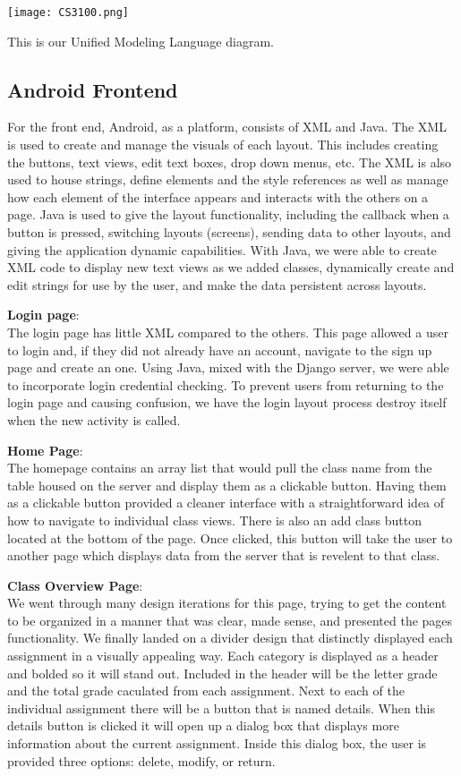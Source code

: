 \documentclass[a4paper]{article} %
\begin{document}
\centerline{\texttt{[image: CS3100.png]}}
This is our Unified Modeling Language diagram.

\subsection{Android Frontend}
For the front end, Android, as a platform, consists of XML and Java. The XML is used to create and manage the visuals of each layout. This includes creating the buttons, text views, edit text boxes, drop down menus, etc. The XML is also used to house strings, define elements and the style references as well as manage how each element of the interface appears and interacts with the others on a page. Java is used to give the layout functionality, including the callback when a button is pressed, switching layouts (screens), sending data to other layouts, and giving the application dynamic capabilities. With Java, we were able to create XML code to display new text views as we added classes, dynamically create and edit strings for use by the user, and make the data persistent across layouts.

\textbf{Login page}:\\
The login page has little XML compared to the others. This page allowed a user to login and, if they did not already have an account, navigate to the sign up page and create an one. Using Java, mixed with the Django server, we were able to incorporate login credential checking. To prevent users from returning to the login page and causing confusion, we have the login layout process destroy itself when the new activity is called. 

\textbf{Home Page}:\\ 
The homepage contains an array list that would pull the class name from the table housed on the server and display them as a clickable button. Having them as a clickable button provided a cleaner interface with a straightforward idea of how to navigate to individual class views. There is also an add class button located at the bottom of the page. Once  clicked, this button will take the user to another page which displays data from the server that is revelent to that class.

\textbf{Class Overview Page}:\\
We went through many design iterations for this page, trying to get the content to be organized in a manner that was clear, made sense, and presented the pages functionality. We finally landed on a divider design that distinctly displayed each assignment in a visually appealing way. Each category is displayed as a header and bolded so it will stand out. Included in the header will be the letter grade and the total grade caculated from each assignment. Next to each of the individual assignment there will be a button that is named details. When this details button is clicked it will open up a dialog box that displays more information about the current assignment. Inside this dialog box, the user is provided three options: delete, modify, or return.
\end{document}
